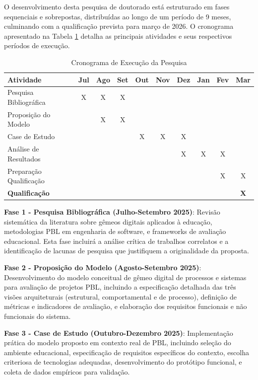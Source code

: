\documentclass[12pt, a4paper, oneside]{abntex2}
\begin{document}
O desenvolvimento desta pesquisa de doutorado está estruturado em fases sequenciais e sobrepostas, distribuídas ao longo de um período de 9 meses, culminando com a qualificação prevista para março de 2026. O cronograma apresentado na Tabela \ref{tab:cronograma} detalha as principais atividades e seus respectivos períodos de execução.

\begin{table}[htbp]
\centering
\caption{Cronograma de Execução da Pesquisa}
\label{tab:cronograma}
\small
\begin{tabular}{|l|c|c|c|c|c|c|c|c|c|}
\hline
\textbf{Atividade} & \textbf{Jul} & \textbf{Ago} & \textbf{Set} & \textbf{Out} & \textbf{Nov} & \textbf{Dez} & \textbf{Jan} & \textbf{Fev} & \textbf{Mar} \\
\hline
Pesquisa Bibliográfica & X & X & X & & & & & & \\
\hline
Proposição do Modelo & & X & X & & & & & & \\
\hline
Case de Estudo & & & & X & X & X & & & \\
\hline
Análise de Resultados & & & & & & X & X & X & \\
\hline
Preparação Qualificação & & & & & & & & X & X \\
\hline
\textbf{Qualificação} & & & & & & & & & \textbf{X} \\
\hline
\end{tabular}
\end{table}

\textbf{Fase 1 - Pesquisa Bibliográfica (Julho-Setembro 2025)}: Revisão sistemática da literatura sobre gêmeos digitais aplicados à educação, metodologias PBL em engenharia de software, e frameworks de avaliação educacional. Esta fase incluirá a análise crítica de trabalhos correlatos e a identificação de lacunas de pesquisa que justifiquem a originalidade da proposta.

\textbf{Fase 2 - Proposição do Modelo (Agosto-Setembro 2025)}: Desenvolvimento do modelo conceitual de gêmeo digital de processos e sistemas para avaliação de projetos PBL, incluindo a especificação detalhada das três visões arquiteturais (estrutural, comportamental e de processo), definição de métricas e indicadores de avaliação, e elaboração dos requisitos funcionais e não funcionais do sistema.

\textbf{Fase 3 - Case de Estudo (Outubro-Dezembro 2025)}: Implementação prática do modelo proposto em contexto real de PBL, incluindo seleção do ambiente educacional, especificação de requisitos específicos do contexto, escolha criteriosa de tecnologias adequadas, desenvolvimento do protótipo funcional, e coleta de dados empíricos para validação.
\end{document}
